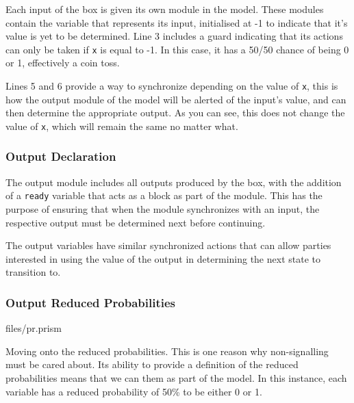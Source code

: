 \documentclass[report.tex]{subfiles}
\begin{document}
Each input of the box is given its own module in the model. These modules
contain the variable that represents its input, initialised at -1 to indicate
that it's value is yet to be determined. Line 3 includes a guard indicating that
its actions can only be taken if \texttt{x} is equal to -1. In this case, it has
a 50/50 chance of being 0 or 1, effectively a coin toss.

Lines 5 and 6 provide a way to synchronize depending on the value of \texttt{x},
this is how the output module of the model will be alerted of the input's value,
and can then determine the appropriate output. As you can see, this does not
change the value of \texttt{x}, which will remain the same no matter what.

\subsubsection{Output Declaration} %
\label{ssub:output_declaration}
 

The output module includes all outputs produced by the box, with the addition of
a \texttt{ready} variable that acts as a block as part of the module. This has
the purpose of ensuring that when the module synchronizes with an input, the
respective output must be determined next before continuing. 

The output variables have similar synchronized actions that can allow parties 
interested in using the value of the output in determining the next state to
transition to.

\subsubsection{Output Reduced Probabilities} %
\label{ssub:output_reduced_probabilities}

{files/pr.prism} 

Moving onto the reduced probabilities. This is one reason why non-signalling
must be cared about. Its ability to provide a definition of the reduced
probabilities means that we can them as part of the model. In this instance,
each variable has a reduced probability of 50\% to be either 0 or 1. 
\end{document}
